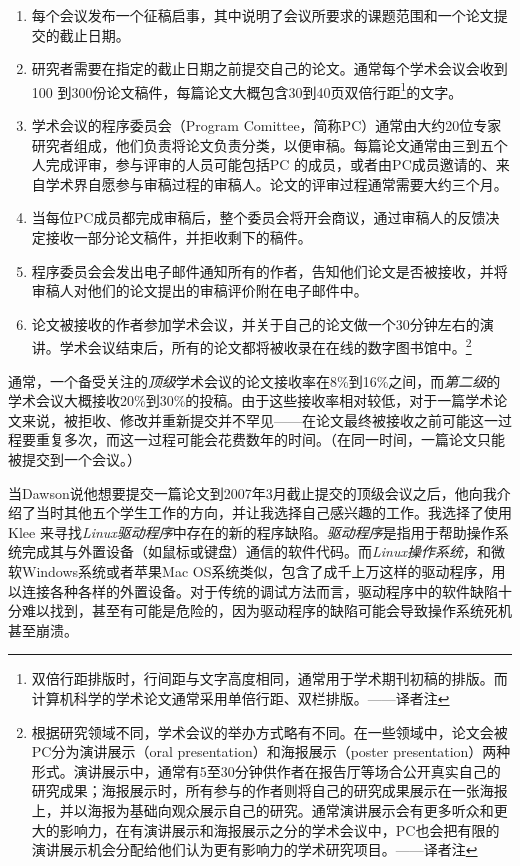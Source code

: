 \documentclass[12pt,UTF8,nofonts]{book}
\begin{document}
\begin{enumerate}
\item 每个会议发布一个征稿启事，其中说明了会议所要求的课题范围和一个论文提交的截止日期。
\item 研究者需要在指定的截止日期之前提交自己的论文。通常每个学术会议会收到100 到300份论文稿件，每篇论文大概包含30到40页双倍行距\footnote{双倍行距排版时，行间距与文字高度相同，通常用于学术期刊初稿的排版。而计算机科学的学术论文通常采用单倍行距、双栏排版。——译者注}的文字。
\item 学术会议的程序委员会（Program Comittee，简称PC）通常由大约20位专家研究者组成，他们负责将论文负责分类，以便审稿。每篇论文通常由三到五个人完成评审，参与评审的人员可能包括PC 的成员，或者由PC成员邀请的、来自学术界自愿参与审稿过程的审稿人。论文的评审过程通常需要大约三个月。
\item 当每位PC成员都完成审稿后，整个委员会将开会商议，通过审稿人的反馈决定接收一部分论文稿件，并拒收剩下的稿件。
\item 程序委员会会发出电子邮件通知所有的作者，告知他们论文是否被接收，并将审稿人对他们的论文提出的审稿评价附在电子邮件中。
\item 论文被接收的作者参加学术会议，并关于自己的论文做一个30分钟左右的演讲。学术会议结束后，所有的论文都将被收录在在线的数字图书馆中。\footnote{根据研究领域不同，学术会议的举办方式略有不同。在一些领域中，论文会被PC分为演讲展示（oral presentation）和海报展示（poster presentation）两种形式。演讲展示中，通常有5至30分钟供作者在报告厅等场合公开真实自己的研究成果；海报展示时，所有参与的作者则将自己的研究成果展示在一张海报上，并以海报为基础向观众展示自己的研究。通常演讲展示会有更多听众和更大的影响力，在有演讲展示和海报展示之分的学术会议中，PC也会把有限的演讲展示机会分配给他们认为更有影响力的学术研究项目。——译者注}
\end{enumerate}

通常，一个备受关注的\emph{顶级}学术会议的论文接收率在8\%到16\%之间，而\emph{第二级}的学术会议大概接收20\%到30\%的投稿。由于这些接收率相对较低，对于一篇学术论文来说，被拒收、修改并重新提交并不罕见——在论文最终被接收之前可能这一过程要重复多次，而这一过程可能会花费数年的时间。（在同一时间，一篇论文只能被提交到一个会议。）

\breakline

当Dawson说他想要提交一篇论文到2007年3月截止提交的顶级会议之后，他向我介绍了当时其他五个学生工作的方向，并让我选择自己感兴趣的工作。我选择了使用Klee 来寻找\emph{Linux驱动程序}中存在的新的程序缺陷。\emph{驱动程序}是指用于帮助操作系统完成其与外置设备（如鼠标或键盘）通信的软件代码。而\emph{Linux操作系统}，和微软Windows系统或者苹果Mac OS系统类似，包含了成千上万这样的驱动程序，用以连接各种各样的外置设备。对于传统的调试方法而言，驱动程序中的软件缺陷十分难以找到，甚至有可能是危险的，因为驱动程序的缺陷可能会导致操作系统死机甚至崩溃。
\end{document}
